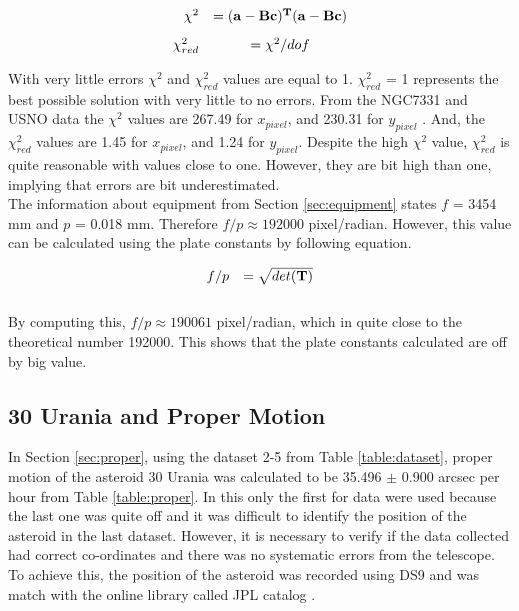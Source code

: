 \documentclass[a4paper,12pt]{article}
\begin{document}
\begin{equation}
\label{eq:chi}
\begin{array}{rcl}
   \vspace{0.3cm}
   \chi^2 &= \bf{(a-Bc)^{T} (a-Bc)}\\
   \chi_{red}^2 &= \chi^2/dof
\end{array}
\end{equation}

With very little errors $\chi^2$ and $\chi_{red}^2$ values are equal to 1. $\chi_{red}^2$ = 1 represents the best possible solution with very little to no errors. From the NGC7331 and USNO data the $\chi^2$ values are  267.49 for $x_{pixel}$, and 230.31 for $y_{pixel}$ . And, the $\chi_{red}^{2}$ values are  1.45 for $x_{pixel}$, and 1.24 for $y_{pixel}$. Despite the high $\chi^2$ value, $\chi_{red}^2$ is quite reasonable with values close to one. However, they are bit high than one, implying that errors are bit underestimated. \\

\indent The information about equipment from Section \ref{sec:equipment} states $f$ = 3454 mm and $p$ = 0.018 mm. Therefore $f/p \approx 192000$ pixel/radian. However, this value can be calculated using the plate constants by following equation. 

\begin{equation}
\label{eq:det}
\begin{array}{rcl}
   \vspace{0.3cm}
   f/p &= \sqrt{det(\bf{T})}
\end{array}
\end{equation}

By computing this, $f/p \approx 190061$ pixel/radian, which in quite close to the theoretical number 192000. This shows that the plate constants calculated are off by big value.

\subsection{30 Urania and Proper Motion} 
\label{sec:asteroid}

In Section \ref{sec:proper}, using the dataset 2-5 from Table \ref{table:dataset}, proper motion of the asteroid 30 Urania was calculated to be 35.496 $\pm$ 0.900 arcsec per hour from Table \ref{table:proper}. In this only the first for data were used because the last one was quite off and it was difficult to identify the position of the asteroid in the last dataset. However, it is necessary to verify if the data collected had correct co-ordinates and there was no systematic errors from the telescope. To achieve this, the position of the asteroid was recorded using DS9 and was match with the online library called JPL catalog \cite{jpl}.  
\end{document}
